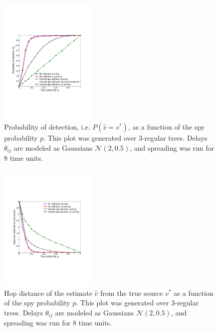 \documentclass[10pt, twocolumn]{article}
\begin{document}
\begin{figure}
\centering
\includegraphics[height = 2.4in]{figures/pd_vs_spies}
\caption{Probability of detection, i.e. $P(\hat v = v^*)$, as a function of the spy probability $p$. This plot was generated over 3-regular trees. Delays $\theta_{ij}$ are modeled as Gaussians $\mathcal N(2,0.5)$, and spreading was run for 8 time units.}
\label{fig:pd_vs_spies}
\end{figure}

\begin{figure}
\centering
\includegraphics[height = 2.4in]{figures/hops_vs_spies}
\caption{Hop distance of the estimate $\hat v$ from the true source $v^*$ as a function of the spy probability $p$. This plot was generated over 3-regular trees. Delays $\theta_{ij}$ are modeled as Gaussians $\mathcal N(2,0.5)$, and spreading was run for 8 time units.}
\label{fig:pd_vs_spies}
\end{figure}




\end{document}
